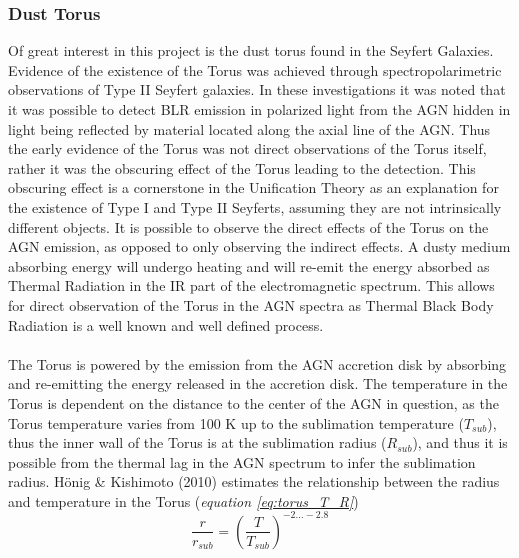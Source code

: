 \documentclass[a4paper, 12pt, twoside]{article}
\begin{document}
\subsubsection{Dust Torus}
Of great interest in this project is the dust torus found in the Seyfert Galaxies. Evidence of the existence of the Torus was achieved through spectropolarimetric observations of Type II Seyfert galaxies. In these investigations it was noted that it was possible to detect BLR emission in polarized light from the AGN hidden in light being reflected by material located along the axial line of the AGN. Thus the early evidence of the Torus was not direct observations of the Torus itself, rather it was the obscuring effect of the Torus leading to the detection. This obscuring effect is a cornerstone in the Unification Theory as an explanation for the existence of Type I and Type II Seyferts, assuming they are not intrinsically different objects. It is possible to observe the direct effects of the Torus on the AGN emission, as opposed to only observing the indirect effects. A dusty medium absorbing energy will undergo heating and will re-emit the energy absorbed as Thermal Radiation in the IR part of the electromagnetic spectrum. This allows for direct observation of the Torus in the AGN spectra as Thermal Black Body Radiation is a well known and well defined process. \\
\\
The Torus is powered by the emission from the AGN accretion disk by absorbing and re-emitting the energy released in the accretion disk. The temperature in the Torus is dependent on the distance to the center of the AGN in question, as the Torus temperature varies from 100 K up to the sublimation temperature ($T_{sub}$), thus the inner wall of the Torus is at the sublimation radius ($R_{sub}$), and thus it is possible from the thermal lag in the AGN spectrum to infer the sublimation radius. Hönig \& Kishimoto (2010) estimates the relationship between the radius and temperature in the Torus (\emph{equation \ref{eq:torus_T_R}}) 
\begin{equation}
\frac{r}{r_{sub}} = (\frac{T}{T_{sub}})^{-2...-2.8}
\label{eq:torus_T_R}
\end{equation}\\
\\
\end{document}
